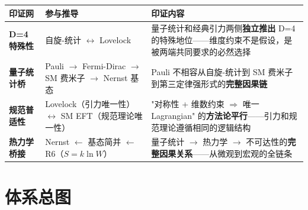 \begin{center}
\footnotesize
\begin{longtable}{p{2.5cm}p{5cm}p{6cm}}
\toprule
\textbf{印证网} & \textbf{参与推导} & \textbf{印证内容} \\
\midrule
\textbf{D=4 特殊性} & 自旋-统计 $\leftrightarrow$ Lovelock & 量子统计和经典引力两侧\textbf{独立推出} D=4 的特殊地位——维度约束不是假设，是被两端共同要求的必然选择 \\
\textbf{量子统计桥} & Pauli $\to$ Fermi-Dirac $\to$ SM 费米子 $\to$ Nernst 基态 & Pauli 不相容从自旋-统计到 SM 费米子到第三定律强形式的\textbf{完整因果链} \\
\textbf{规范普适性} & Lovelock（引力唯一性）$\leftrightarrow$ SM EFT（规范理论唯一性） & "对称性 + 维数约束 $\Rightarrow$ 唯一 Lagrangian" 的\textbf{方法论平行}——引力和规范理论遵循相同的逻辑结构 \\
\textbf{热力学桥接} & Nernst $\leftarrow$ 基态简并 $\leftarrow$ R6（$S=k\ln W$） & 量子统计 $\to$ 热力学 $\to$ 不可达性的\textbf{完整因果关系}——从微观到宏观的全链条 \\
\bottomrule
\end{longtable}
\end{center}

\section{体系总图}

